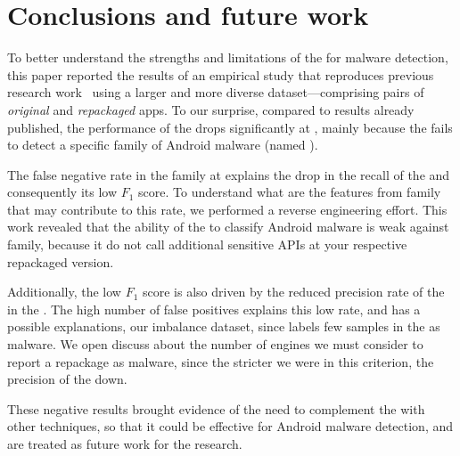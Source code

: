 \section{Conclusions and future work}\label{sec:conclusions}


To better understand the strengths and limitations of the \mas for malware detection, this paper reported the results of an empirical study that reproduces previous research work~\cite{DBLP:conf/wcre/BaoLL18,DBLP:journals/jss/CostaMMSSBNR22} using a larger and more diverse dataset---comprising \apps pairs of \emph{original} and \emph{repackaged} apps. To our surprise, compared to results already published, the performance of the \mas drops significantly at \cds, mainly because the \mas fails to detect a specific family of Android malware (named \gps). 

The false negative rate in the \gps family at \cds explains the drop in the recall of the \mas and consequently its low $F_1$ score. To understand what are the features from \gps family that may contribute to this rate, we performed a reverse engineering effort. This work revealed that the ability of the \mas to classify Android malware is weak against \gps family, because it do not call additional sensitive APIs at your respective repackaged version.

Additionally, the low $F_1$ score is also driven by the reduced precision rate of the \mas in the \cds. The high number of false positives explains this low rate, and has a possible explanations, our imbalance dataset, since \vt labels few samples in the \cds as malware. We open discuss about the number of engines we must consider to \vt report a repackage as malware, since the stricter we were in this criterion, the precision of the \mas down.

These negative results brought evidence of the need to complement the \mas with other techniques, so that it could be effective for Android malware detection, and are treated as future work for the research.
